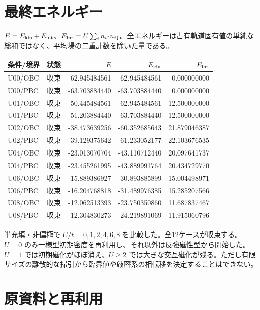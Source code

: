 \documentclass[a4paper,10pt,oneside,openany]{ltjsreport}
\begin{document}
\section*{最終エネルギー}

$E=E_{\rm kin}+E_{\rm int}$、$E_{\rm int}=U\sum_i n_{i\uparrow}n_{i\downarrow}$。全エネルギーは占有軌道固有値の単純な総和ではなく、平均場の二重計数を除いた量である。

\begin{center}\small\setlength{\tabcolsep}{4pt}
\begin{longtable}{lrrrr}
\toprule
条件/境界 & 状態 & $E$ & $E_{\rm kin}$ & $E_{\rm int}$ \\ \midrule
\endhead
U00/OBC & 収束 & -62.945484561 & -62.945484561 & 0.000000000 \\
U00/PBC & 収束 & -63.703884440 & -63.703884440 & 0.000000000 \\
U01/OBC & 収束 & -50.445484561 & -62.945484561 & 12.500000000 \\
U01/PBC & 収束 & -51.203884440 & -63.703884440 & 12.500000000 \\
U02/OBC & 収束 & -38.473639256 & -60.352685643 & 21.879046387 \\
U02/PBC & 収束 & -39.129375642 & -61.233052177 & 22.103676535 \\
U04/OBC & 収束 & -23.013070704 & -43.110712440 & 20.097641737 \\
U04/PBC & 収束 & -23.455261995 & -43.889991764 & 20.434729770 \\
U06/OBC & 収束 & -15.889386927 & -30.893885899 & 15.004498971 \\
U06/PBC & 収束 & -16.204768818 & -31.489976385 & 15.285207566 \\
U08/OBC & 収束 & -12.062513393 & -23.750350860 & 11.687837467 \\
U08/PBC & 収束 & -12.304830273 & -24.219891069 & 11.915060796 \\
\bottomrule\end{longtable}\end{center}

半充填・非偏極で $U/t=0,1,2,4,6,8$ を比較した。全12ケースが収束する。$U=0$ のみ一様型初期密度を再利用し、それ以外は反強磁性型から開始した。$U=1$ では初期磁化がほぼ消え、$U\ge2$ では大きな交互磁化が残る。ただし有限サイズの離散的な掃引から臨界値や厳密系の相転移を決定することはできない。

\section*{原資料と再利用}
\end{document}
